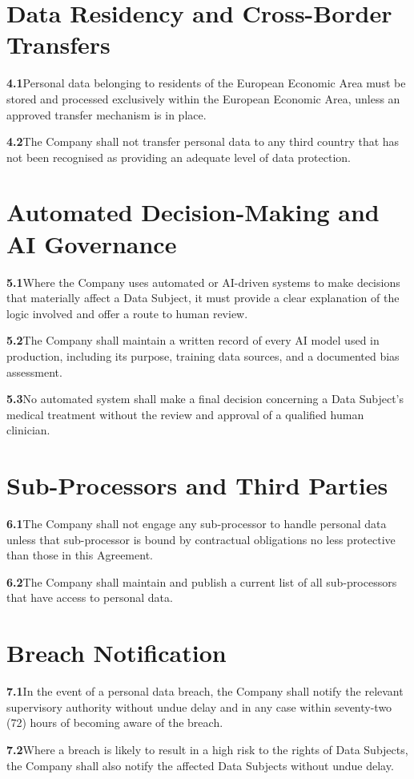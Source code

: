 \documentclass[acmsmall,nonacm]{acmart}
\newcommand{\clause}[2]{\par\smallskip\noindent\textbf{#1}\quad #2}
\begin{document}
\section{Data Residency and Cross-Border Transfers}
\clause{4.1}{Personal data belonging to residents of the European Economic Area must be
stored and processed exclusively within the European Economic Area, unless an approved
transfer mechanism is in place.}
\clause{4.2}{The Company shall not transfer personal data to any third country that has not
been recognised as providing an adequate level of data protection.}

\section{Automated Decision-Making and AI Governance}
\clause{5.1}{Where the Company uses automated or AI-driven systems to make decisions that
materially affect a Data Subject, it must provide a clear explanation of the logic involved
and offer a route to human review.}
\clause{5.2}{The Company shall maintain a written record of every AI model used in
production, including its purpose, training data sources, and a documented bias assessment.}
\clause{5.3}{No automated system shall make a final decision concerning a Data Subject's
medical treatment without the review and approval of a qualified human clinician.}

\section{Sub-Processors and Third Parties}
\clause{6.1}{The Company shall not engage any sub-processor to handle personal data unless
that sub-processor is bound by contractual obligations no less protective than those in this
Agreement.}
\clause{6.2}{The Company shall maintain and publish a current list of all sub-processors
that have access to personal data.}

\section{Breach Notification}
\clause{7.1}{In the event of a personal data breach, the Company shall notify the relevant
supervisory authority without undue delay and in any case within seventy-two (72) hours of
becoming aware of the breach.}
\clause{7.2}{Where a breach is likely to result in a high risk to the rights of Data
Subjects, the Company shall also notify the affected Data Subjects without undue delay.}
\end{document}
